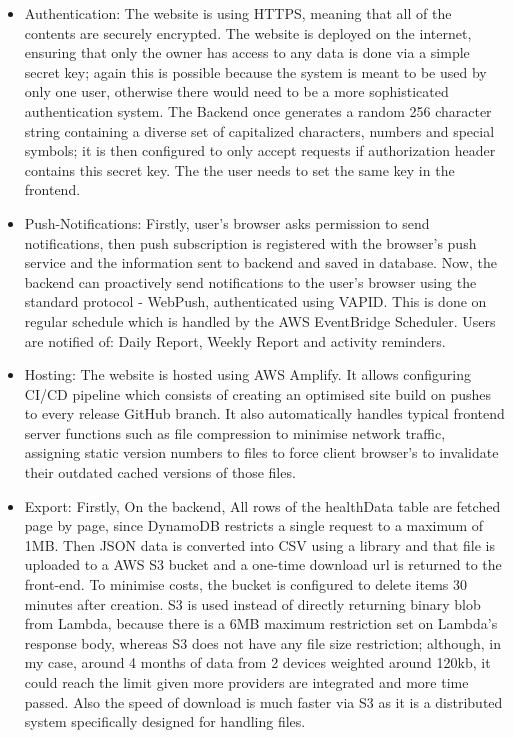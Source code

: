 \begin{itemize}
    \item {Authentication: The website is using HTTPS, meaning that all of the contents are securely encrypted. The website is deployed on the internet, ensuring that only the owner has access to any data is done via a simple secret key; again this is possible because the system is meant to be used by only one user, otherwise there would need to be a more sophisticated authentication system. The Backend once generates a random 256 character string containing a diverse set of capitalized characters, numbers and special symbols; it is then configured to only accept requests if authorization header contains this secret key. The the user needs to set the same key in the frontend.}
    \item {Push-Notifications: Firstly, user's browser asks permission to send notifications, then push subscription is registered with the browser's push service and the information sent to backend and saved in database. Now, the backend can proactively send notifications to the user's browser using the standard protocol - WebPush, authenticated using VAPID. This is done on regular schedule which is handled by the AWS EventBridge Scheduler. Users are notified of: Daily Report, Weekly Report and activity reminders. }
    \item {Hosting: The website is hosted using AWS Amplify. It allows configuring CI/CD pipeline which consists of creating an optimised site build on pushes to every release GitHub branch. It also automatically handles typical frontend server functions such as file compression to minimise network traffic, assigning static version numbers to files to force client browser's to invalidate their outdated cached versions of those files.}
    \item {Export: Firstly, On the backend, All rows of the healthData table are fetched page by page, since DynamoDB restricts a single request to a maximum of 1MB. Then JSON data is converted into CSV using a library and that file is uploaded to a AWS S3 bucket and a one-time download url is returned to the front-end. To minimise costs, the bucket is configured to delete items 30 minutes after creation. S3 is used instead of directly returning binary blob from Lambda, because there is a 6MB maximum restriction set on Lambda's response body, whereas S3 does not have any file size restriction; although, in my case, around 4 months of data from 2 devices weighted around 120kb, it could reach the limit given more providers are integrated and more time passed. Also the speed of download is much faster via S3 as it is a distributed system specifically designed for handling files.}
\end{itemize}
